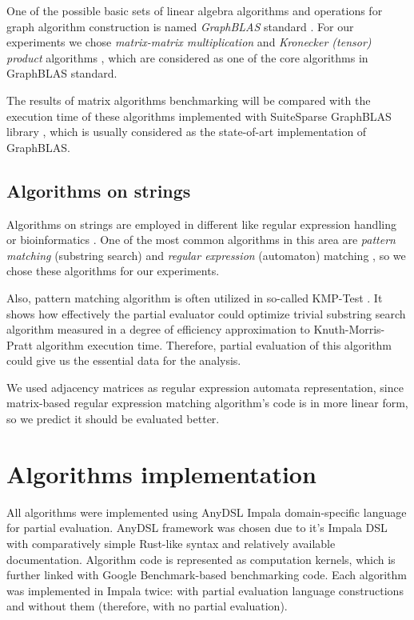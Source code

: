 \documentclass[conference]{IEEEtran}
\begin{document}
One of the possible basic sets of linear algebra algorithms and operations for graph algorithm construction is named \textit{GraphBLAS} standard \cite{davis2019algorithm,moreira2018implementing}. For our experiments we chose \textit{matrix-matrix multiplication} and \textit{Kronecker (tensor) product} algorithms \cite{cormen2009introduction}, which are considered as one of the core algorithms in GraphBLAS standard.

The results of matrix algorithms benchmarking will be compared with the execution time of these algorithms implemented with SuiteSparse GraphBLAS library \cite{moreira2018implementing}, which is usually considered as the state-of-art implementation of GraphBLAS.


\subsection{Algorithms on strings}

Algorithms on strings are employed in different like regular expression handling or bioinformatics \cite{rajesh2010unusual}. One of the most common algorithms in this area are \textit{pattern matching} (substring search) and \textit{regular expression} (automaton) matching \cite{cormen2009introduction}, so we chose these algorithms for our experiments.

Also, pattern matching algorithm is often utilized in so-called KMP-Test \cite{jones1993partial}. It shows how effectively the partial evaluator could optimize trivial substring search algorithm measured in a degree of efficiency approximation to Knuth-Morris-Pratt algorithm execution time. Therefore, partial evaluation of this algorithm could give us the essential data for the analysis.

We used adjacency matrices as regular expression automata representation, since matrix-based regular expression matching algorithm's code is in more linear form, so we predict it should be evaluated better.

\section{Algorithms implementation}

All algorithms were implemented using AnyDSL Impala domain-specific language \cite{leissa2018anydsl} for partial evaluation. AnyDSL framework was chosen due to it's Impala DSL with comparatively simple Rust-like syntax and relatively available documentation. Algorithm code is represented as computation kernels, which is further linked with Google Benchmark-based \cite{gbenchmark} benchmarking code. Each algorithm was implemented in Impala twice: with partial evaluation language constructions and without them (therefore, with no partial evaluation).
\end{document}

